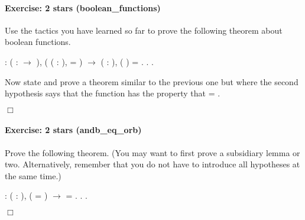 \documentclass[12pt]{report}
\begin{document}
\paragraph{Exercise: 2 stars (boolean\_functions)}

 Use the tactics you have learned so far to prove the following 
    theorem about boolean functions. \begin{coqdoccode}
\coqdocemptyline
\coqdocnoindent
{}  : \coqdoceol
\coqdocindent{1.00em}
\coqdockw{\ensuremath{\forall}} ( :  \ensuremath{\rightarrow} ), \coqdoceol
\coqdocindent{1.00em}
(\coqdockw{\ensuremath{\forall}} ( : ),   = ) \ensuremath{\rightarrow}\coqdoceol
\coqdocindent{1.00em}
\coqdockw{\ensuremath{\forall}} ( : ),  ( ) = .\coqdoceol
\coqdocnoindent
{}.\coqdoceol
 .\coqdoceol
\coqdocemptyline
\end{coqdoccode}
Now state and prove a theorem  similar
    to the previous one but where the second hypothesis says that the
    function  has the property that   =  .\begin{coqdoccode}
\coqdocemptyline
\end{coqdoccode}
\ensuremath{\Box} 

\paragraph{Exercise: 2 stars (andb\_eq\_orb)}

 Prove the following theorem.  (You may want to first prove a
    subsidiary lemma or two. Alternatively, remember that you do
    not have to introduce all hypotheses at the same time.) \begin{coqdoccode}
\coqdocemptyline
\coqdocnoindent
{}  : \coqdoceol
\coqdocindent{1.00em}
\coqdockw{\ensuremath{\forall}} (  : ),\coqdoceol
\coqdocindent{1.00em}
(   =   ) \ensuremath{\rightarrow}\coqdoceol
\coqdocindent{1.00em}
 = .\coqdoceol
\coqdocnoindent
{}.\coqdoceol
 .\coqdoceol
\end{coqdoccode}
\ensuremath{\Box} 
\end{document}
